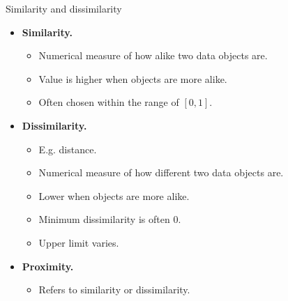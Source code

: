 \documentclass[aspectratio=169,t]{beamer}
\begin{document}
  { 
    \begin{frame}{Similarity and dissimilarity}
    \centering
    \begin{itemize}
        \item \textbf{Similarity.}
        \begin{itemize}
          \item Numerical measure of how alike two data objects are.
          \item Value is higher when objects are more alike.
          \item Often chosen within the range of $[0,1]$.
        \end{itemize}
        \item \textbf{Dissimilarity.}
        \begin{itemize}
          \item E.g. distance.
          \item Numerical measure of how different two data objects are.
          \item Lower when objects are more alike.
          \item Minimum dissimilarity is often $0$.
          \item Upper limit varies.
        \end{itemize}
        \item \textbf{Proximity.}
        \begin{itemize}
          \item Refers to similarity or dissimilarity.
        \end{itemize}
    \end{itemize}
    \end{frame}
  }
\end{document}
